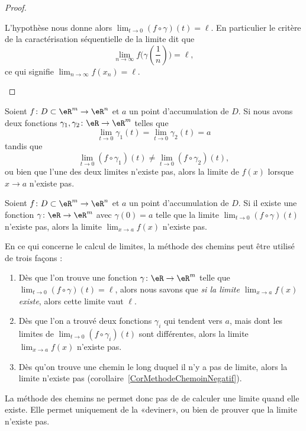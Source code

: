 \begin{proof}
\begin{subproof}
\begin{subproof}
                    L'hypothèse nous donne alors \( \lim_{t\to 0} (f\circ \gamma)(t)=\ell\). En particulier le critère de la caractérisation séquentielle de la limite dit que
                    \begin{equation}
                        \lim_{n\to \infty} f\big( \gamma(\frac{1}{ n }) \big)=\ell,
                    \end{equation}
                    ce qui signifie \( \lim_{n\to \infty} f(x_n)=\ell\).
            \end{subproof}
    \end{subproof}
\end{proof}

\begin{corollary}	\label{CorMethodeChemin}
	Soient $f\colon D\subset\eR^m\to \eR^n$ et $a$ un point d'accumulation de $D$. Si nous avons deux fonctions $\gamma_1,\gamma_2\colon \eR\to \eR^m$ telles que
	\begin{equation}
		\lim_{t\to 0} \gamma_1(t)=\lim_{t\to 0} \gamma_2(t)=a
	\end{equation}
	tandis que
	\begin{equation}
		\lim_{t\to 0} (f\circ \gamma_1)(t)\neq\lim_{t\to 0} (f\circ \gamma_2)(t),
	\end{equation}
	ou bien que l'une des deux limites n'existe pas, alors la limite de $f(x)$ lorsque $x\to a$ n'existe pas.
\end{corollary}

\begin{corollary}	\label{CorMethodeChemoinNegatif}
	Soient $f\colon D\subset\eR^m\to \eR^n$ et $a$ un point d'accumulation de $D$. Si il existe une fonction $\gamma\colon \eR\to \eR^m$ avec $\gamma(0)=a$ telle que la limite $\lim_{t\to 0} (f\circ\gamma)(t)$ n'existe pas, alors la limite $\lim_{x\to a} f(x)$ n'existe pas.
\end{corollary}

En ce qui concerne le calcul de limites, la méthode des chemins peut être utilisé de trois façons :
\begin{enumerate}
	\item
		Dès que l'on trouve une fonction $\gamma\colon \eR\to \eR^m$ telle que $\lim_{t\to 0} (f\circ \gamma)(t)=\ell$, alors nous savons que \emph{si la limite $\lim_{x\to a} f(x)$ existe}, alors cette limite vaut $\ell$.
	\item
		Dès que l'on a trouvé deux fonctions $\gamma_i$ qui tendent vers $a$, mais dont les limites de $\lim_{t\to 0} (f\circ\gamma_i)(t)$ sont différentes, alors la limite $\lim_{x\to a} f(x)$ n'existe pas.
	\item
		Dès qu'on trouve une chemin le long duquel il n'y a pas de limite, alors la limite n'existe pas (corollaire~\ref{CorMethodeChemoinNegatif}).
\end{enumerate}
La méthode des chemins ne permet donc pas de de calculer une limite quand elle existe. Elle permet uniquement de la «deviner», ou bien de prouver que la limite n'existe pas.

